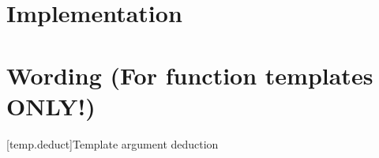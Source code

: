 \documentclass{wg21}
\begin{document}
\section{Implementation}


\section{Wording (For function templates ONLY!)}

[temp.deduct]{Template argument deduction}

%
%
%
\end{document}
